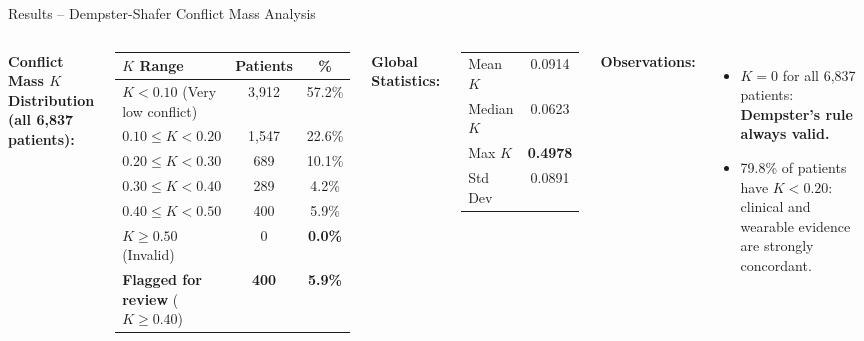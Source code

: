 \documentclass[aspectratio=169]{beamer}
\begin{document}
\begin{frame}{Results -- Dempster-Shafer Conflict Mass Analysis}
  \begin{columns}[T]
      \textbf{Conflict Mass $K$ Distribution (all 6,837 patients):}
      \begin{center}\small
      \begin{tabular}{@{}lcc@{}}
        \toprule
        \textbf{$K$ Range} & \textbf{Patients} & \textbf{\%} \\
        \midrule
        $K < 0.10$ (Very low conflict) & 3,912 & 57.2\% \\
        $0.10 \leq K < 0.20$           & 1,547 & 22.6\% \\
        $0.20 \leq K < 0.30$           & 689   & 10.1\% \\
        $0.30 \leq K < 0.40$           & 289   &  4.2\% \\
        $0.40 \leq K < 0.50$           & 400   &  5.9\% \\
        $K \geq 0.50$ (Invalid)        & 0     &  \textbf{0.0\%} \\
        \midrule
        \textbf{Flagged for review} ($K\geq0.40$) & \textbf{400} & \textbf{5.9\%} \\
        \bottomrule
      \end{tabular}
      \end{center}
      \textbf{Global Statistics:}
      \begin{center}\small
      \begin{tabular}{@{}lc@{}}
        \toprule
        Mean $K$   & 0.0914 \\
        Median $K$ & 0.0623 \\
        Max $K$    & \textbf{0.4978} \\
        Std Dev    & 0.0891 \\
        \bottomrule
      \end{tabular}
      \end{center}
      \textbf{Observations:}
      \begin{itemize}\small
        \item $K{=}0$ for all 6,837 patients: \textbf{Dempster's rule always valid.}
        \item 79.8\% of patients have $K{<}0.20$:
              clinical and wearable evidence are strongly concordant.

\end{itemize}
\end{columns}
\end{frame}
\end{document}
